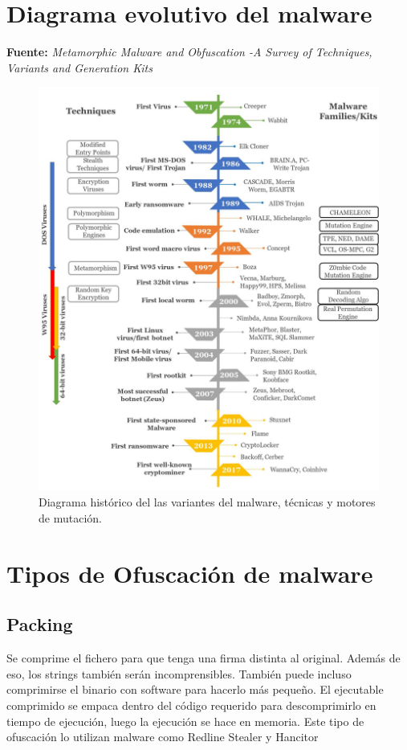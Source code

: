 \documentclass[15pt]{article}
\begin{document}
	
	\newpage
	\section{Diagrama evolutivo del malware}
	\textbf{Fuente:} \textit{Metamorphic Malware and Obfuscation -A Survey of Techniques, Variants and Generation Kits} \cite{techniques}
	
	\begin{figure}[h]
		\centering
		\includegraphics[width=14cm]{images/history.jpeg}
		\caption{Diagrama histórico del las variantes del malware, técnicas y motores de mutación. }
	\end{figure}

	\newpage

	\section{Tipos de Ofuscación de malware}
	\subsection{Packing}
	Se comprime el fichero para que tenga una firma distinta al original. Además de eso, los strings también serán incomprensibles. También puede incluso comprimirse el binario con software para hacerlo más pequeño. El ejecutable comprimido se empaca dentro del código requerido para descomprimirlo en tiempo de ejecución, luego la ejecución se hace en memoria. Este tipo de ofuscación lo utilizan malware como Redline Stealer \cite{redlinestealer} y Hancitor \cite{hancitor}
	
\end{document}
